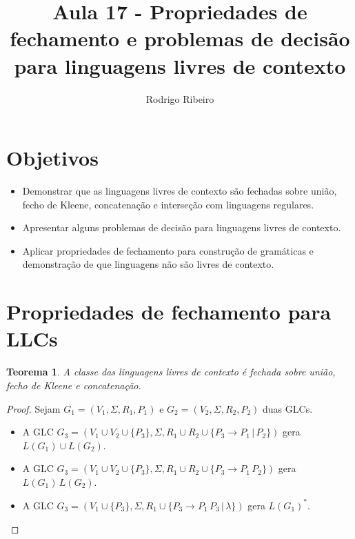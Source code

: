 \documentclass[a4paper]{article}
\newtheorem{Theorem}{Teorema}
\theoremstyle{definition}
\begin{document}
  \title{Aula 17 - Propriedades de fechamento e problemas de decisão para
    linguagens livres de contexto}
  \author{Rodrigo Ribeiro}

  \maketitle


  \pagestyle{fancy}


  \section*{Objetivos}

  \begin{itemize}
     \item Demonstrar que as linguagens livres de contexto são fechadas sobre
       união, fecho de Kleene, concatenação e interseção com linguagens regulares.
     \item Apresentar alguns problemas de decisão para linguagens livres de
       contexto.
     \item Aplicar propriedades de fechamento para construção de gramáticas e
       demonstração de que linguagens não são livres de contexto.
  \end{itemize}

  \section{Propriedades de fechamento para LLCs}

  \begin{Theorem}
    A classe das linguagens livres de contexto é fechada sobre união, fecho de
    Kleene e concatenação.
  \end{Theorem}

  \begin{proof}
    Sejam $G_1 = (V_1,\Sigma,R_1,P_1)$ e $G_2 = (V_2,\Sigma,R_2,P_2)$ duas GLCs.
    \begin{itemize}
      \item A GLC $G_3 = (V_1 \cup V_2 \cup \{P_3\}, \Sigma, R_1 \cup R_2 \cup
        \{P_3 \to P_1\,|\,P_2\})$ gera $L(G_1) \cup L(G_2)$.
      \item A GLC $G_3 = (V_1 \cup V_2 \cup \{P_3\}, \Sigma, R_1 \cup R_2 \cup
        \{P_3 \to P_1\,P_2\})$ gera $L(G_1) \,L(G_2)$.
      \item A GLC $G_3 = (V_1 \cup \{P_3\}, \Sigma, R_1 \cup 
        \{P_3 \to P_1\,P_3\,|\,\lambda\})$ gera $L(G_1)^*$.
    \end{itemize}
  \end{proof}
\end{document}
